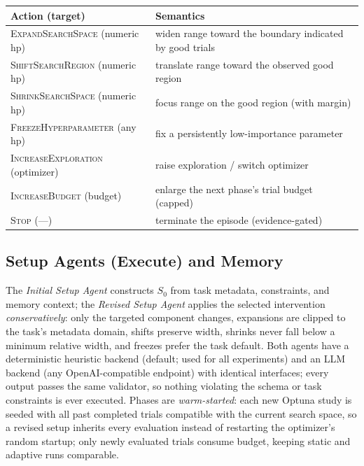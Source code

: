 \documentclass[10pt]{article}
\begin{document}
\begin{center}
\small
{}
\label{tab:actions}
\begin{tabular}{@{}ll@{}}
\toprule
Action (target) & Semantics \\
\midrule
\textsc{ExpandSearchSpace} (numeric hp) & widen range toward the boundary indicated by good trials \\
\textsc{ShiftSearchRegion} (numeric hp) & translate range toward the observed good region \\
\textsc{ShrinkSearchSpace} (numeric hp) & focus range on the good region (with margin) \\
\textsc{FreezeHyperparameter} (any hp) & fix a persistently low-importance parameter \\
\textsc{IncreaseExploration} (optimizer) & raise exploration / switch optimizer \\
\textsc{IncreaseBudget} (budget) & enlarge the next phase's trial budget (capped) \\
\textsc{Stop} (---) & terminate the episode (evidence-gated) \\
\bottomrule
\end{tabular}
\end{center}

\subsection{Setup Agents (Execute) and Memory}
\label{sec:agents}

The \emph{Initial Setup Agent} constructs $S_0$ from task metadata,
constraints, and memory context; the \emph{Revised Setup Agent} applies the
selected intervention \emph{conservatively}: only the targeted component
changes, expansions are clipped to the task's metadata domain, shifts
preserve width, shrinks never fall below a minimum relative width, and
freezes prefer the task default. Both agents have a deterministic
heuristic backend (default; used for all experiments) and an LLM backend
(any OpenAI-compatible endpoint) with identical interfaces; every output
passes the same validator, so nothing violating the schema or task
constraints is ever executed. Phases are \emph{warm-started}: each new
Optuna study is seeded with all past completed trials compatible with the
current search space, so a revised setup inherits every evaluation instead
of restarting the optimizer's random startup; only newly evaluated trials
consume budget, keeping static and adaptive runs comparable.
\end{document}
